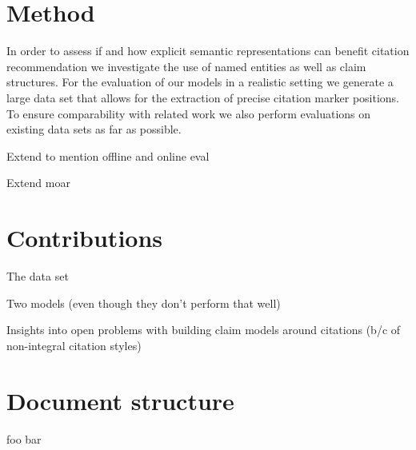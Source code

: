 \section{Method}\label{sec:method}
In order to assess if and how explicit semantic representations can benefit citation recommendation we investigate the use of named entities as well as claim structures. For the evaluation of our models in a realistic setting we generate a large data set that allows for the extraction of precise citation marker positions. To ensure comparability with related work we also perform evaluations on existing data sets as far as possible.

Extend to mention offline and online eval

Extend moar

\section{Contributions}\label{sec:contributions}
The data set

Two models (even though they don't perform that well)

Insights into open problems with building claim models around citations (b/c of non-integral citation styles)

\section{Document structure}\label{sec:documentstructure}
foo bar

